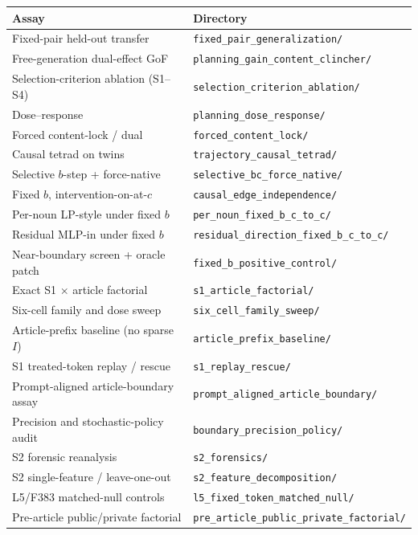 \begin{center}
\small
\begin{tabular}{ll}
\toprule
Assay & Directory \\
\midrule
Fixed-pair held-out transfer & \texttt{fixed\_pair\_generalization/} \\
Free-generation dual-effect GoF & \texttt{planning\_gain\_content\_clincher/} \\
Selection-criterion ablation (S1--S4) & \texttt{selection\_criterion\_ablation/} \\
Dose--response & \texttt{planning\_dose\_response/} \\
Forced content-lock / dual & \texttt{forced\_content\_lock/} \\
Causal tetrad on twins & \texttt{trajectory\_causal\_tetrad/} \\
Selective \(b\)-step + force-native & \texttt{selective\_bc\_force\_native/} \\
Fixed \(b\), intervention-on-at-\(c\) & \texttt{causal\_edge\_independence/} \\
Per-noun LP-style under fixed \(b\) & \texttt{per\_noun\_fixed\_b\_c\_to\_c/} \\
Residual MLP-in under fixed \(b\) & \texttt{residual\_direction\_fixed\_b\_c\_to\_c/} \\
Near-boundary screen + oracle patch & \texttt{fixed\_b\_positive\_control/} \\
Exact S1 \(\times\) article factorial & \texttt{s1\_article\_factorial/} \\
Six-cell family and dose sweep & \texttt{six\_cell\_family\_sweep/} \\
Article-prefix baseline (no sparse \(I\)) & \texttt{article\_prefix\_baseline/} \\
S1 treated-token replay / rescue & \texttt{s1\_replay\_rescue/} \\
Prompt-aligned article-boundary assay & \texttt{prompt\_aligned\_article\_boundary/} \\
Precision and stochastic-policy audit & \texttt{boundary\_precision\_policy/} \\
S2 forensic reanalysis & \texttt{s2\_forensics/} \\
S2 single-feature / leave-one-out & \texttt{s2\_feature\_decomposition/} \\
L5/F383 matched-null controls & \texttt{l5\_fixed\_token\_matched\_null/} \\
Pre-article public/private factorial & \texttt{pre\_article\_public\_private\_factorial/} \\

\end{tabular}
\end{center}
